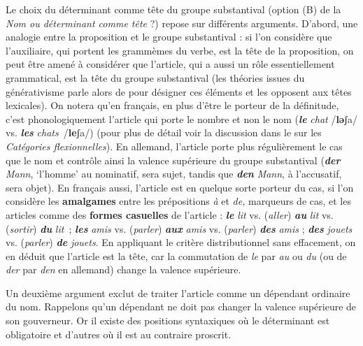 Le choix du déterminant comme tête du groupe substantival (option (B) de la  \textit{Nom ou déterminant comme tête} ?) repose sur différents arguments. D’abord, une analogie entre la proposition et le groupe substantival : si l’on considère que l’auxiliaire, qui portent les grammèmes du verbe, est la tête de la proposition, on peut être amené à considérer que l’article, qui a aussi un rôle essentiellement grammatical, est la tête du groupe substantival (les théories issues du générativisme parle alors de  pour désigner ces éléments et les opposent aux têtes lexicales). On notera qu’en français, en plus d’être le porteur de la définitude, c’est phonologiquement l’article qui porte le nombre et non le nom (\textbf{\textit{le}} \textit{chat} /\textbf{lǝ}ʃa/ vs. \textbf{\textit{les}} \textit{chats}~/\textbf{le}ʃa/) (pour plus de détail voir la discussion dans le  sur les \textit{Catégories flexionnelles}). En allemand, l’article porte plus régulièrement le cas que le nom et contrôle ainsi la valence supérieure du groupe substantival (\textbf{\textit{der}} \textit{Mann}, ‘l’homme’ au nominatif, sera sujet, tandis que \textbf{\textit{den}} \textit{Mann}, à l’accusatif, sera objet). En français aussi, l’article est en quelque sorte porteur du cas, si l’on considère les \textbf{amalgames} entre les prépositions \textit{à} et \textit{de,} marqueurs de cas, et les articles comme des \textbf{formes casuelles} de l’article : \textbf{\textit{le}} \textit{lit} vs. (\textit{aller}) \textbf{\textit{au}} \textit{lit} vs. (\textit{sortir}) \textbf{\textit{du}} \textit{lit~}; \textbf{\textit{les}} \textit{amis} vs. (\textit{parler}) \textbf{\textit{aux}} \textit{amis} vs. (\textit{parler}) \textbf{\textit{des}} \textit{amis} ; \textbf{\textit{des}} \textit{jouets} vs. (\textit{parler}) \textbf{\textit{de}} \textit{jouets}. En appliquant le critère distributionnel sans effacement, on en déduit que l’article est la tête, car la commutation de \textit{le} par \textit{au} ou \textit{du} (ou de \textit{der} par \textit{den} en allemand) change la valence supérieure.

Un deuxième argument exclut de traiter l’article comme un dépendant ordinaire du nom. Rappelons qu’un dépendant ne doit pas changer la valence supérieure de son gouverneur. Or il existe des positions syntaxiques où le déterminant est obligatoire et d’autres où il est au contraire proscrit.

\ea
  \z
\z

